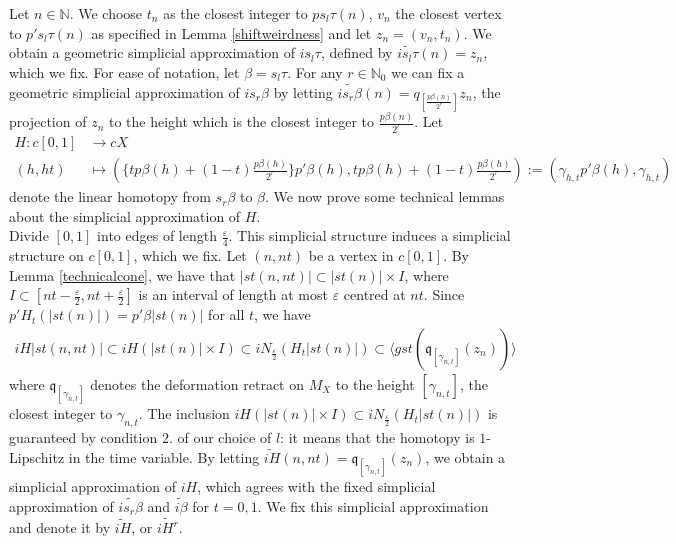 \documentclass[a4paper,11pt]{article}
\theoremstyle{definition}
\theoremstyle{plain}
\theoremstyle{remark}
\begin{document}
{Let $n\in \mathbb{N}$. We choose $t_n$ as the closest integer to $p s_{l}\tau(n)$, $v_{n}$ the closest vertex to $p's_{l}\tau(n)$ as specified in Lemma \ref{shiftweirdness} and let $z_{n} = (v_{n},t_{n})$. We obtain a geometric simplicial approximation of $is_{l}\tau$, defined by $\widetilde{is_{l}\tau}(n) = z_{n}$, which we fix. For ease of notation, let $\beta = s_{l}\tau$. For any $r\in \mathbb{N}_{0}$ we can fix a geometric simplicial approximation of $is_{r} \beta$ by letting $\widetilde{is_{r}\beta}(n) = q_{[\frac{p\beta(n)}{2^r}]} z_{n}$, the projection of $z_{n}$ to the height which is the closest integer to $\frac{p\beta(n)}{2^r}$. Let
\begin{align*}
H: c[0,1] &\rightarrow cX\\
(h,ht)&\mapsto (\{tp\beta(h) + (1-t)\frac{p\beta(h)}{2^r}\} p' \beta (h), tp\beta(h) + (1-t)\frac{p\beta(h)}{2^r}) := (\gamma_{h,t} p'\beta(h), \gamma_{h,t})
\end{align*}
denote the linear homotopy from  $s_{r} \beta$ to $\beta$. We now prove some technical lemmas about the simplicial approximation of $H$. \\

Divide $[0,1]$ into edges of length $\frac{\varepsilon}{4}$. This simplicial structure induces a simplicial structure on $c[0,1]$, which we fix. Let $(n,nt)$ be a vertex in $c[0,1]$. By Lemma \ref{technicalcone}, we have that $|st(n,nt)| \subset |st(n)| \times I$, where $I \subset [nt-\frac{\varepsilon}{2}, nt + \frac{\varepsilon}{2}]$ is an interval of length at most $\varepsilon$ centred at $nt$. Since $p' H_{t}(|st(n)|) = p'\beta |st(n)|$ for all $t$, we have 
\begin{align*}
iH|st(n,nt)|\subset iH (|st(n)| \times I) \subset iN_{\frac{\varepsilon}{2}}( H_{t} |st(n)|) \subset \langle gst (\mathfrak{q}_{[\gamma_{n,t}]}(z_{n}))\rangle 
\end{align*}
where $\mathfrak{q}_{[\gamma_{n,t}]}$ denotes the deformation retract on $M_{X}$ to the height $[\gamma_{n,t}]$, the closest integer to $\gamma_{n,t}$. The inclusion $iH (|st(n)| \times I) \subset iN_{\frac{\varepsilon}{2}}( H_{t} |st(n)|)$ is guaranteed by condition $2.$ of our choice of $l$: it means that the homotopy is $1$-Lipschitz in the time variable. By letting $\widetilde{iH}(n,nt) = \mathfrak{q}_{[\gamma_{n,t}]}(z_{n})$, we obtain a simplicial approximation of $iH$, which agrees with the fixed simplicial approximation of  $\widetilde{is_{r}\beta}$ and  $\widetilde{i\beta}$  for $t=0,1$. We fix this simplicial approximation and denote it by $\widetilde{iH}$, or $\widetilde{iH^{r}}$. \\

}
\end{document}
